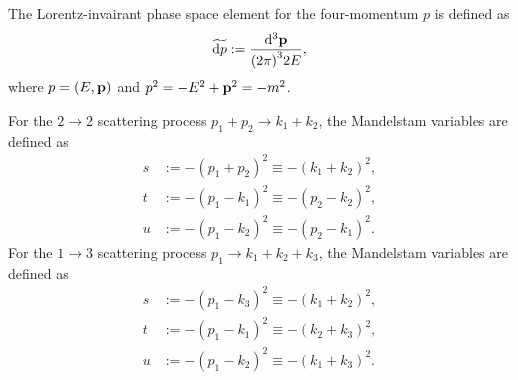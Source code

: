 \documentclass{article}
\begin{document}
            The Lorentz-invairant phase space element for the four-momentum $p$ is defined as
            \begin{equation}
                \tildedp{p} := \frac{\dd[3]{\vb{p}}}{\twopi[3] 2 E},
            \end{equation}
            where $p = \qty(E, \vb{p})$ and $p^2 = -E^2 + \vb{p}^2 = -m^2$.

            For the $2 \to 2$ scattering process $p_1 + p_2 \to k_1 + k_2$, the Mandelstam variables are defined as
            \begin{equation}
                \begin{aligned}
                    s & := -(p_1 + p_2)^2 \equiv -(k_1 + k_2)^2, \\
                    t & := -(p_1 - k_1)^2 \equiv -(p_2 - k_2)^2, \\
                    u & := -(p_1 - k_2)^2 \equiv -(p_2 - k_1)^2.
                \end{aligned}
                \label{eq:s-t-u}
            \end{equation}
            For the $1 \to 3$ scattering process $p_1 \to k_1 + k_2 + k_3$, the Mandelstam variables are defined as
            \begin{equation}
                \begin{aligned}
                    s & := -(p_1 - k_3)^2 \equiv -(k_1 + k_2)^2, \\
                    t & := -(p_1 - k_1)^2 \equiv -(k_2 + k_3)^2, \\
                    u & := -(p_1 - k_2)^2 \equiv -(k_1 + k_3)^2.
                \end{aligned}
            \end{equation}

    \clearpage
    \printbibliography[heading=bibintoc]
\end{document}
